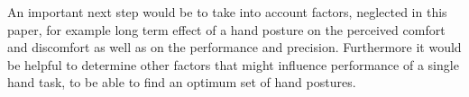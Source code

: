 \documentclass{sig-alternate-05-2015}
\begin{document}
An important next step would be to take into account factors, neglected in this paper, for example long term effect of a hand posture on the perceived comfort and discomfort as well as on the performance and precision. Furthermore it would be helpful to determine other factors that might influence performance of a single hand task, to be able to find an optimum set of hand postures.

%

%
%

\end{document}
